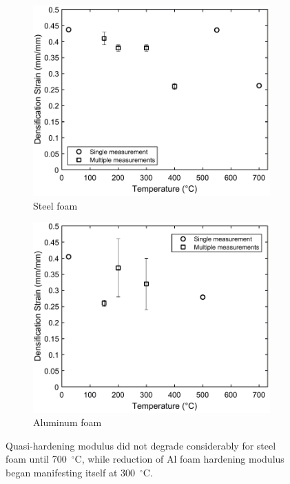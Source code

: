 \documentclass[review]{elsarticle}
\begin{document}
\begin{figure}
	\centering
	\begin{subfigure}{0.50\textwidth}
		\centering
		\includegraphics[width=0.90\linewidth]
		{Tex-Figures/Fig19a-densification-Fe.pdf}
		\caption{Steel foam}
		\label{fig:densification_Steel}
	\end{subfigure}%
	\begin{subfigure}{0.50\textwidth}
		\centering
		\includegraphics[width=0.90\linewidth]
		{Tex-Figures/Fig19b-densification-Al.pdf}
		\caption{Aluminum foam}
		\label{fig:densifiation_Al}
	\end{subfigure}
	\caption{ Quasi-hardening modulus did not degrade considerably for steel foam until 700~$^{\circ}\mathrm{C}$, while reduction of Al foam hardening modulus began manifesting itself at 300~$^{\circ}\mathrm{C}$.}
	\label{fig:densification-modulus}
\end{figure}
\end{document}
